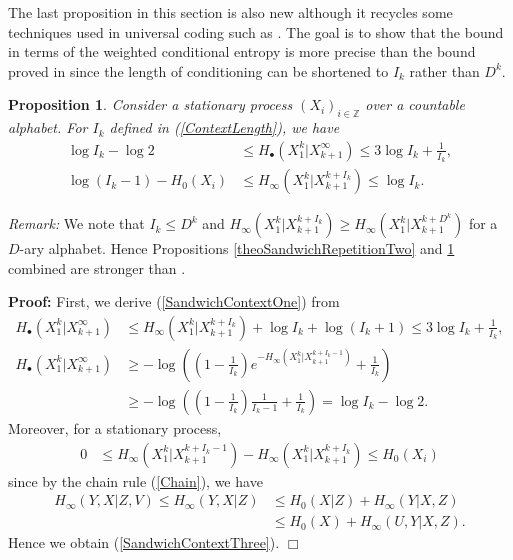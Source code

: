 \documentclass[a4paper]{article}
\newcommand{\okra}[1]{\left( #1 \right)}
\newtheorem{proposition}{Proposition}
\newenvironment*{proof}{\begin{trivlist}\item[]
\noindent\textbf{Proof:}}{$\Box$\par\end{trivlist}}
\begin{document}
The last proposition in this section is also new although it recycles
some techniques used in universal coding such as \citep[Theorem
6.11]{Debowski21}. The goal is to show that the bound in terms of the
weighted conditional entropy is more precise than the bound proved in
\citep[Theorem 8]{Debowski18b} since the length of conditioning can be
shortened to $I_k$ rather than $D^k$.
\begin{proposition}
  \label{theoSandwichContext}
  Consider a stationary process $(X_i)_{i\in\mathbb{Z}}$ over a
  countable alphabet.  For $I_k$ defined in (\ref{ContextLength}), we
  have
\begin{align}
  \label{SandwichContextOne}
  \log I_k-\log 2&\le H_\bullet(X_1^k|X_{k+1}^\infty)\le
  3\log I_k+\frac{1}{I_k}
  ,
  \\
  \label{SandwichContextThree}
  \log (I_k-1)-H_0(X_i)&\le H_\infty(X_1^k|X_{k+1}^{k+I_k})\le \log I_k
                              .
\end{align}
\end{proposition}
\emph{Remark:} We note that $I_k\le D^k$ and
$H_\infty(X_1^k|X_{k+1}^{k+I_k})\ge H_\infty(X_1^k|X_{k+1}^{k+D^k})$
for a $D$-ary alphabet. Hence Propositions
\ref{theoSandwichRepetitionTwo} and \ref{theoSandwichContext} combined
are stronger than \citep[Theorem 8]{Debowski18b}.
\begin{proof}
First, we derive (\ref{SandwichContextOne}) from
\begin{align}
  H_\bullet(X_1^k|X_{k+1}^\infty)
  &\le
    H_\infty(X_1^k|X_{k+1}^{k+I_k})+\log I_k+\log (I_k+1)\le
    3\log I_k+\frac{1}{I_k},
  \\
  H_\bullet(X_1^k|X_{k+1}^\infty)
  &\ge
    -\log\okra{\okra{1-\frac{1}{I_k}}e^{-H_\infty(X_1^k|X_{k+1}^{k+I_k-1})}
    +\frac{1}{I_k}}
    \nonumber\\
  &\ge -\log\okra{\okra{1-\frac{1}{I_k}}\frac{1}{I_k-1}+\frac{1}{I_k}}
    =\log I_k-\log 2.
\end{align}
Moreover, for a stationary process,
\begin{align}
  0
  &\le
    H_\infty(X_1^k|X_{k+1}^{k+I_k-1})-H_\infty(X_1^k|X_{k+1}^{k+I_k})\le
    H_0(X_i)
\end{align}
since by the chain rule (\ref{Chain}), we have
\begin{align}
  H_\infty(Y,X|Z,V)\le H_\infty(Y,X|Z)
  &\le H_0(X|Z)+H_\infty(Y|X,Z)
    \nonumber\\
  &\le H_0(X)+H_\infty(U,Y|X,Z). 
\end{align}
Hence we obtain (\ref{SandwichContextThree}).
\end{proof}
\end{document}
